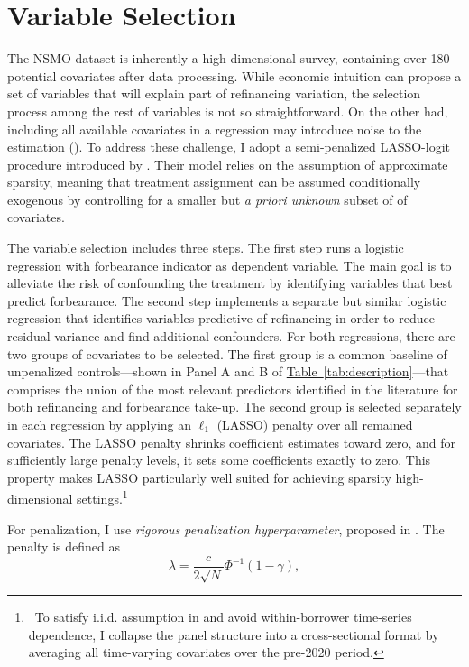 \documentclass[11pt]{article}
\begin{document}
{\section{Variable Selection}
\label{appendix:lasso}
The NSMO dataset is inherently a high-dimensional survey, containing over 180 potential covariates after data processing. While economic intuition can propose a set of variables that will explain part of refinancing variation, the selection process among the rest of variables is not so straightforward. On the other had, including all available covariates in a regression may introduce noise to the estimation (\citet{belloni2014inference}). To address these challenge, I adopt a semi-penalized LASSO-logit procedure introduced by \citet{belloni2016post}. Their model relies on the assumption of approximate sparsity, meaning that treatment assignment can be assumed conditionally exogenous by controlling for a smaller but \textit{a priori unknown} subset of  of covariates.


The variable selection includes three steps. The first step runs a logistic regression with forbearance indicator as dependent variable. The main goal is to alleviate the risk of confounding the treatment by identifying variables that best predict forbearance. The second step implements a separate but similar logistic regression that identifies variables predictive of refinancing in order to reduce residual variance and find additional confounders. For both regressions, there are two groups of covariates to be selected. The first group is a common baseline of unpenalized controls—shown in Panel A and B of \hyperref[tab:description]{Table~\ref*{tab:description}}—that comprises the union of the most relevant predictors identified in the literature for both refinancing and forbearance take-up. The second group is selected separately in each regression by applying an $\ell_1$ (LASSO) penalty over all remained covariates. The LASSO penalty shrinks coefficient estimates toward zero, and for sufficiently large penalty levels, it sets some coefficients exactly to zero. This property makes LASSO particularly well suited for achieving sparsity high-dimensional settings.\footnote{~To satisfy i.i.d. assumption in \citet{belloni2014inference, belloni2016post} and avoid within-borrower time-series dependence, I collapse the panel structure into a cross-sectional format by averaging all time-varying covariates over the pre-2020 period.} 


For penalization, I use \textit{rigorous penalization hyperparameter}, proposed in \citet{belloni2016post}. The penalty is defined as
\[
\lambda = \frac{c}{2\sqrt{N}} \Phi^{-1}(1 - \gamma),
\]

}
\end{document}
